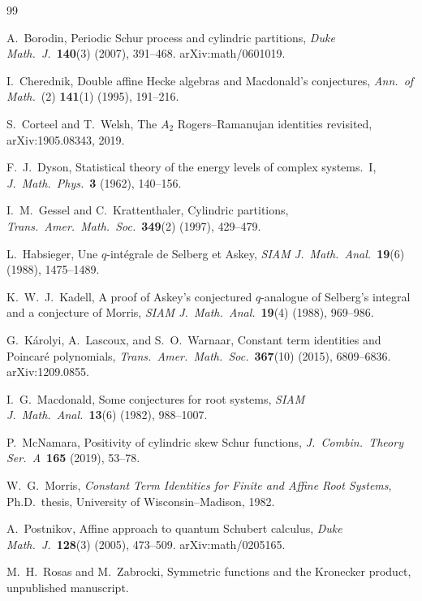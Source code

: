 \documentclass[11pt]{article}
\begin{document}
\begin{thebibliography}{99}

A.~Borodin,
Periodic Schur process and cylindric partitions,
\emph{Duke Math.\ J.}\ \textbf{140}(3) (2007), 391--468.
arXiv:math/0601019.

I.~Cherednik,
Double affine Hecke algebras and Macdonald's conjectures,
\emph{Ann.\ of Math.}\ (2) \textbf{141}(1) (1995), 191--216.

S.~Corteel and T.~Welsh,
The $A_2$ Rogers--Ramanujan identities revisited,
arXiv:1905.08343, 2019.

F.~J.~Dyson,
Statistical theory of the energy levels of complex systems.~I,
\emph{J.\ Math.\ Phys.}\ \textbf{3} (1962), 140--156.

I.~M.~Gessel and C.~Krattenthaler,
Cylindric partitions,
\emph{Trans.\ Amer.\ Math.\ Soc.}\ \textbf{349}(2) (1997),
429--479.

L.~Habsieger,
Une $q$-int\'egrale de Selberg et Askey,
\emph{SIAM J.\ Math.\ Anal.}\ \textbf{19}(6) (1988),
1475--1489.

K.~W.~J.~Kadell,
A proof of Askey's conjectured $q$-analogue of Selberg's integral
and a conjecture of Morris,
\emph{SIAM J.\ Math.\ Anal.}\ \textbf{19}(4) (1988), 969--986.

G.~K\'arolyi, A.~Lascoux, and S.~O.~Warnaar,
Constant term identities and Poincar\'e polynomials,
\emph{Trans.\ Amer.\ Math.\ Soc.}\ \textbf{367}(10) (2015),
6809--6836.
arXiv:1209.0855.

I.~G.~Macdonald,
Some conjectures for root systems,
\emph{SIAM J.\ Math.\ Anal.}\ \textbf{13}(6) (1982), 988--1007.

P.~McNamara,
Positivity of cylindric skew Schur functions,
\emph{J.\ Combin.\ Theory Ser.~A}\ \textbf{165} (2019), 53--78.

W.~G.~Morris,
\emph{Constant Term Identities for Finite and Affine Root Systems},
Ph.D.\ thesis, University of Wisconsin--Madison, 1982.

A.~Postnikov,
Affine approach to quantum Schubert calculus,
\emph{Duke Math.\ J.}\ \textbf{128}(3) (2005), 473--509.
arXiv:math/0205165.

M.~H.~Rosas and M.~Zabrocki,
Symmetric functions and the Kronecker product,
unpublished manuscript.


\end{thebibliography}
\end{document}
